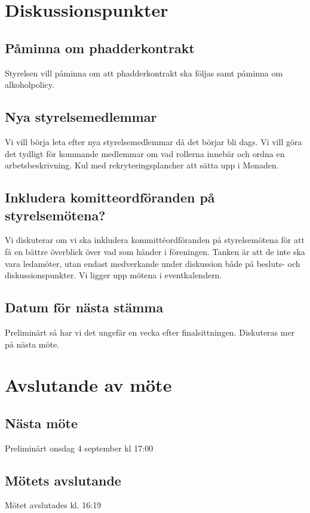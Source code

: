 \documentclass[protokoll]{dvd}
\begin{document}
\section{Diskussionspunkter}

\subsection*{Påminna om phadderkontrakt}
Styrelsen vill påminna om att phadderkontrakt ska följas samt påminna om alkoholpolicy.

\subsection*{Nya styrelsemedlemmar}
Vi vill börja leta efter nya styrelsemedlemmar då det börjar bli dags. Vi vill göra det tydligt för kommande medlemmar om vad rollerna innebär och ordna en arbetsbeskrivning.
Kul med rekryteringsplancher att sätta upp i Monaden.

\subsection*{Inkludera komitteordföranden på styrelsemötena?}
Vi diskuterar om vi ska inkludera kommittéordföranden på styrelsemötena för att få en bättre överblick över vad som händer i föreningen. Tanken är att de inte ska vara ledamöter, utan endast medverkande under diskussion både på besluts- och diskussionspunkter.
Vi ligger upp mötena i eventkalendern.

\subsection*{Datum för nästa stämma}
Preliminärt så har vi det ungefär en vecka efter finalsittningen. Diskuteras mer på nästa möte.


\newpage
\section{Avslutande av möte}

\subsection{Nästa möte} Preliminärt onsdag 4 september kl 17:00


\subsection{Mötets avslutande}
Mötet avslutades kl. 16:19

\styrelsesignaturer
\end{document}
